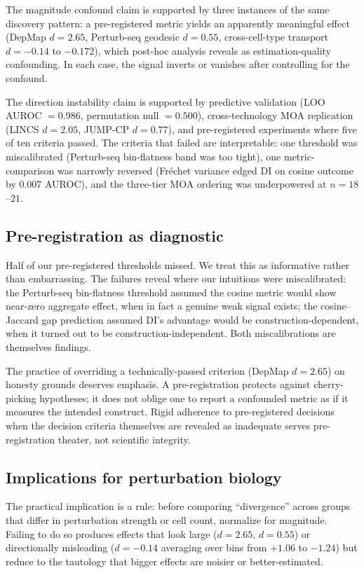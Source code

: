 \documentclass[11pt]{article}
\begin{document}
The magnitude confound claim is supported by three instances of the same
discovery pattern: a pre-registered metric yields an apparently
meaningful effect (DepMap $d = 2.65$, Perturb-seq geodesic $d = 0.55$,
cross-cell-type transport $d = -0.14$ to $-0.172$), which post-hoc
analysis reveals as estimation-quality confounding. In each case, the
signal inverts or vanishes after controlling for the confound.

The direction instability claim is supported by predictive validation
(LOO AUROC $= 0.986$, permutation null $= 0.500$), cross-technology MOA
replication (LINCS $d = 2.05$, JUMP-CP $d = 0.77$), and
pre-registered experiments where five of ten criteria passed. The
criteria that failed are interpretable: one threshold was miscalibrated
(Perturb-seq bin-flatness band was too tight), one metric-comparison was
narrowly reversed (Fr\'{e}chet variance edged DI on cosine outcome by
0.007 AUROC), and the three-tier MOA ordering was underpowered at $n =
18$--$21$.

\subsection{Pre-registration as diagnostic}

Half of our pre-registered thresholds missed. We treat this as
informative rather than embarrassing. The failures reveal where our
intuitions were miscalibrated: the Perturb-seq bin-flatness threshold
assumed the cosine metric would show near-zero aggregate effect,
when in fact a genuine weak signal exists; the cosine--Jaccard
gap prediction assumed DI's advantage would be construction-dependent,
when it turned out to be construction-independent. Both miscalibrations
are themselves findings.

The practice of overriding a technically-passed criterion (DepMap $d =
2.65$) on honesty grounds deserves emphasis. A pre-registration
protects against cherry-picking hypotheses; it does not oblige one to
report a confounded metric as if it measures the intended construct.
Rigid adherence to pre-registered decisions when the decision criteria
themselves are revealed as inadequate serves pre-registration theater,
not scientific integrity.

\subsection{Implications for perturbation biology}

The practical implication is a rule: before comparing ``divergence''
across groups that differ in perturbation strength or cell count,
normalize for magnitude. Failing to do so produces effects that look
large ($d = 2.65$, $d = 0.55$) or directionally misleading ($d = -0.14$
averaging over bins from $+1.06$ to $-1.24$) but reduce to the
tautology that bigger effects are noisier or better-estimated.
\end{document}
